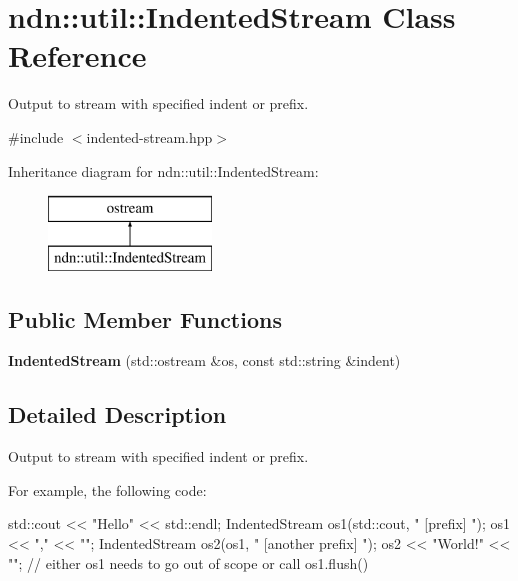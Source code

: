 \hypertarget{classndn_1_1util_1_1IndentedStream}{}\section{ndn\+:\+:util\+:\+:Indented\+Stream Class Reference}
\label{classndn_1_1util_1_1IndentedStream}


Output to stream with specified indent or prefix.  




{\ttfamily \#include $<$indented-\/stream.\+hpp$>$}

Inheritance diagram for ndn\+:\+:util\+:\+:Indented\+Stream\+:\begin{figure}[H]
\begin{center}
\leavevmode
\includegraphics[height=2.000000cm]{classndn_1_1util_1_1IndentedStream}
\end{center}
\end{figure}
\subsection*{Public Member Functions}
\begin{DoxyCompactItemize}
\item 
{\bfseries Indented\+Stream} (std\+::ostream \&os, const std\+::string \&indent)\hypertarget{classndn_1_1util_1_1IndentedStream_a5c3587ba93c5b783462e4c3f95d634da}{}\label{classndn_1_1util_1_1IndentedStream_a5c3587ba93c5b783462e4c3f95d634da}

\end{DoxyCompactItemize}


\subsection{Detailed Description}
Output to stream with specified indent or prefix. 

For example, the following code\+: \begin{DoxyVerb}std::cout << "Hello" << std::endl;
IndentedStream os1(std::cout, " [prefix] ");
os1 << "," << "\n";
{
  IndentedStream os2(os1, " [another prefix] ");
  os2 << "World!" << "\n";
}
// either os1 needs to go out of scope or call os1.flush()
\end{DoxyVerb}


